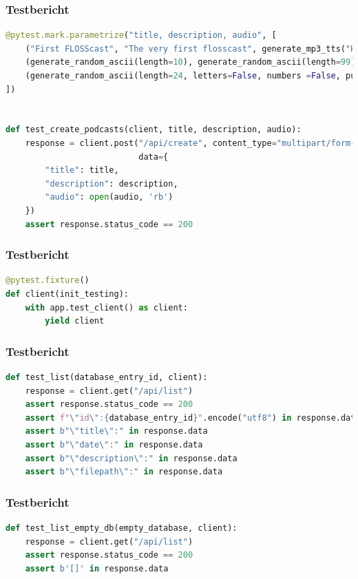 \documentclass{beamer}
\begin{document}
\begin{frame}[fragile]
\frametitle{Testbericht}
\begin{lstlisting}[language=Python, caption=Test-Implementation von \texttt{/api/create}]
@pytest.mark.parametrize("title, description, audio", [ 
    ("First FLOSScast", "The very first flosscast", generate_mp3_tts("Hello to the very first flosscast episode.", lang="en")), 
    (generate_random_ascii(length=10), generate_random_ascii(length=99), generate_mp3_size(1024)), 
    (generate_random_ascii(length=24, letters=False, numbers =False, punctuation=True), generate_random_ascii(length=240, punctuation=True), generate_mp3_duration(30)) 
]) 
 
 
def test_create_podcasts(client, title, description, audio): 
    response = client.post("/api/create", content_type="multipart/form-data", 
                           data={ 
        "title": title, 
        "description": description, 
        "audio": open(audio, 'rb') 
    }) 
    assert response.status_code == 200 
\end{lstlisting}
\end{frame}

\begin{frame}[fragile]
\frametitle{Testbericht}
\begin{lstlisting}[language=Python, caption=Implementation der \texttt{client}-Fixture]
@pytest.fixture() 
def client(init_testing): 
    with app.test_client() as client: 
        yield client 
\end{lstlisting}
\end{frame}

\begin{frame}[fragile]
\frametitle{Testbericht}
\begin{lstlisting}[language=Python, caption=Test-Implementation von \texttt{/api/list}]
def test_list(database_entry_id, client): 
    response = client.get("/api/list") 
    assert response.status_code == 200 
    assert f"\"id\":{database_entry_id}".encode("utf8") in response.data 
    assert b"\"title\":" in response.data 
    assert b"\"date\":" in response.data 
    assert b"\"description\":" in response.data 
    assert b"\"filepath\":" in response.data 
\end{lstlisting}
\end{frame}

\begin{frame}[fragile]
\frametitle{Testbericht}
\begin{lstlisting}[language=Python, caption=Test-Implementation von \texttt{/api/list} gegen eine leere Datenbank]
def test_list_empty_db(empty_database, client): 
    response = client.get("/api/list") 
    assert response.status_code == 200 
    assert b'[]' in response.data 
\end{lstlisting}
\end{frame}
\end{document}
